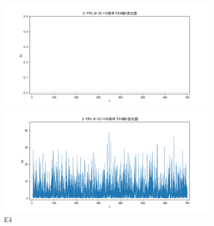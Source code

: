 \documentclass[10pt, a4paper]{article}
\begin{document}
    \begin{figure}[H]
        \begin{minipage}[t]{0.49\textwidth}
            \centering
            \includegraphics[width=\textwidth]{./q6_pics/cmp/E4.png}
        \end{minipage}
        \begin{minipage}[t]{0.49\textwidth}
            \centering
            \includegraphics[width=\textwidth]{./q6_pics/exp/E4.png}
        \end{minipage}
        \caption{E4}\label{fig:E4 in q6}
    \end{figure}
\end{document}
